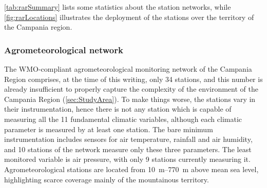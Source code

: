 \documentclass[authoryear,preprint,review,12pt]{elsarticle}
\begin{document}
\cref{tab:rarSummary} lists some statistics about the station networks, while \cref{fig:rarLocations} illustrates the deployment of the stations over the territory of the Campania region.

\subsubsection{Agrometeorological network\label{RARStructure}}

The WMO-compliant agrometeorological monitoring network of the Campania Region comprises, at the time of this writing, only 34 stations, and this number is already insufficient to properly capture the complexity of the environment of the Campania Region (\cref{sec:StudyArea}).
To make things worse, the stations vary in their instrumentation, hence there is not any station which is capable of measuring all the 11 fundamental climatic variables, although each climatic parameter is measured by at least one station.
The bare minimum instrumentation includes sensors for air temperature, rainfall and air humidity, and 10 stations of the network measure only these three parameters.
The least monitored variable is air pressure, with only 9 stations currently measuring it.
Agrometeorological stations are located from \SIrange{10}{770}{\metre} above mean sea level, highlighting scarce coverage mainly of the mountainous territory.
\end{document}
